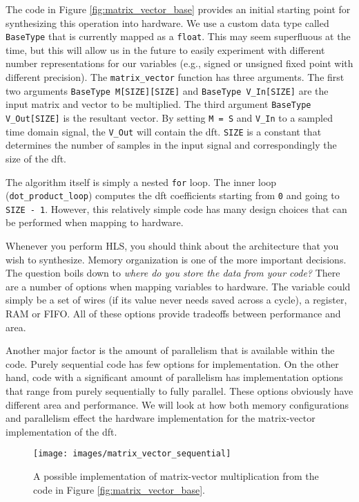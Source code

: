 The code in Figure \ref{fig:matrix_vector_base} provides an initial starting point for synthesizing this operation into hardware. We use a custom data type called \lstinline|BaseType| that is currently mapped as a \lstinline|float|. This may seem superfluous at the time, but this will allow us in the future to easily experiment with different number representations for our variables (e.g., signed or unsigned fixed point with different precision). The \lstinline|matrix_vector| function has three arguments. The first two arguments \lstinline|BaseType M[SIZE][SIZE]| and \lstinline|BaseType V_In[SIZE]| are the input matrix and vector to be multiplied. The third argument \lstinline|BaseType V_Out[SIZE]| is the resultant vector. By setting \lstinline|M = S|  and \lstinline|V_In| to a sampled time domain signal, the \lstinline|V_Out| will contain the \gls{dft}. \lstinline|SIZE| is a constant that determines the number of samples in the input signal and correspondingly the size of the \gls{dft}.

The algorithm itself is simply a nested \lstinline|for| loop. The inner loop (\lstinline|dot_product_loop|) computes the \gls{dft} coefficients starting from \lstinline|0| and going to \lstinline|SIZE - 1|. However, this relatively simple code has many design choices that can be performed when mapping to hardware. 

Whenever you perform HLS, you should think about the architecture that you wish to synthesize. Memory organization is one of the more important decisions. The question boils down to \emph{where do you store the data from your code?} There are a number of options when mapping variables to hardware. The variable could simply be a set of wires (if its value never needs saved across a cycle), a register, RAM or FIFO. All of these options provide tradeoffs between performance and area. 

Another major factor is the amount of parallelism that is available within the code. Purely sequential code has few options for implementation. On the other hand, code with a significant amount of parallelism has implementation options that range from purely sequentially to fully parallel. These options obviously have different area and performance. We will look at how both memory configurations and parallelism effect the hardware implementation for the matrix-vector implementation of the \gls{dft}.

\begin{figure}
\centering
%
\texttt{[image: images/matrix\_vector\_sequential]}

\caption{A possible implementation of matrix-vector multiplication from the code in Figure \ref{fig:matrix_vector_base}.}
\label{fig:matrix_vector_sequential}
\end{figure}

